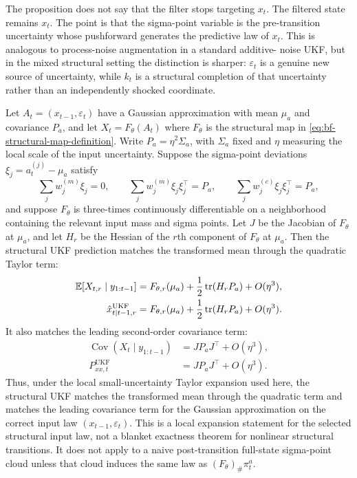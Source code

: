The proposition does not say that the filter stops targeting $x_t$.  The
filtered state remains $x_t$.  The point is that the sigma-point variable is the
pre-transition uncertainty whose pushforward generates the predictive law of
$x_t$.  This is analogous to process-noise augmentation in a standard additive-
noise UKF, but in the mixed structural setting the distinction is sharper:
$\varepsilon_t$ is a genuine new source of uncertainty, while $k_t$ is a
structural completion of that uncertainty rather than an independently shocked
coordinate.

\begin{proposition}
\label{prop:bf-structural-ukf-ut-accuracy}
Let $A_t=(x_{t-1},\varepsilon_t)$ have a Gaussian approximation with mean
$\mu_a$ and covariance $P_a$, and let
$X_t=F_\theta(A_t)$ where $F_\theta$ is the structural map in
\eqref{eq:bf-structural-map-definition}.  Write
$P_a=\eta^2\Sigma_a$, with $\Sigma_a$ fixed and $\eta$ measuring the local
scale of the input uncertainty.  Suppose the sigma-point deviations
$\xi_j=a_t^{(j)}-\mu_a$ satisfy
\begin{equation}
  \sum_j w_j^{(m)}\xi_j=0,
  \qquad
  \sum_j w_j^{(m)}\xi_j\xi_j^\top=P_a,
  \qquad
  \sum_j w_j^{(c)}\xi_j\xi_j^\top=P_a,
\end{equation}
and suppose $F_\theta$ is three-times continuously differentiable on a
neighborhood containing the relevant input mass and sigma points.  Let $J$ be
the Jacobian of $F_\theta$ at $\mu_a$, and let $H_r$ be the Hessian of the
$r$th component of $F_\theta$ at $\mu_a$.  Then the structural UKF prediction
matches the transformed mean through the quadratic Taylor term:
\begin{align}
  \mathbb{E}[X_{t,r}\mid y_{1:t-1}]
    &=
    F_{\theta,r}(\mu_a)
    +\frac{1}{2}\operatorname{tr}(H_rP_a)
    +O(\eta^3),\\
  \hat x_{t|t-1,r}^{\mathrm{UKF}}
    &=
    F_{\theta,r}(\mu_a)
    +\frac{1}{2}\operatorname{tr}(H_rP_a)
    +O(\eta^3).
    \label{eq:bf-structural-ukf-second-order-mean}
\end{align}
It also matches the leading second-order covariance term:
\begin{align}
  \operatorname{Cov}(X_t\mid y_{1:t-1})
    &=
    JP_aJ^\top+O(\eta^3),\\
  P_{xx,t}^{\mathrm{UKF}}
    &=
    JP_aJ^\top+O(\eta^3).
    \label{eq:bf-structural-ukf-second-order-cov}
\end{align}
Thus, under the local small-uncertainty Taylor expansion used here, the
structural UKF matches the transformed mean through the quadratic term and
matches the leading covariance term for the Gaussian approximation on the
correct input law $(x_{t-1},\varepsilon_t)$.  This is a local expansion
statement for the selected structural input law, not a blanket exactness theorem
for nonlinear structural transitions.  It does not apply to a naive
post-transition full-state sigma-point cloud unless that cloud induces the same
law as $(F_\theta)_\#\pi_t^a$.
\end{proposition}

